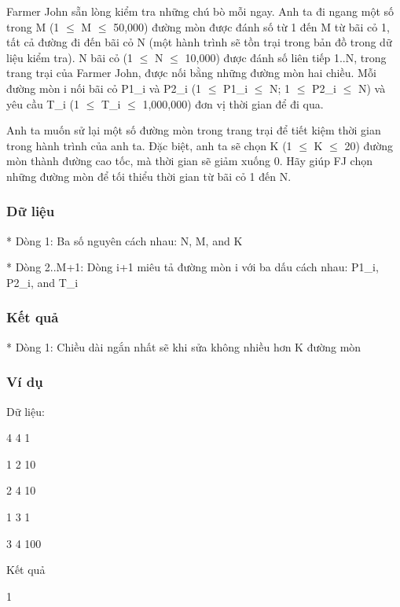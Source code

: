



   Farmer John sẵn lòng kiểm tra những chú bò mỗi ngay. Anh ta đi ngang một số  trong M (1  $\le$  M  $\le$  50,000) đường mòn được đánh số từ 1 đến M từ bãi cỏ 1, tất  cả đường đi đến bãi cỏ N (một hành trình sẽ tồn trại trong bản đồ trong dữ  liệu kiểm tra). N bãi cỏ (1  $\le$  N  $\le$  10,000) được đánh số liên tiếp 1..N, trong  trang trại của Farmer John, được nối bằng những đường mòn hai chiều. Mỗi đường  mòn i nối bãi cỏ P1\_i và P2\_i (1  $\le$  P1\_i  $\le$  N; 1  $\le$  P2\_i  $\le$  N) và yêu cầu T\_i  (1  $\le$  T\_i  $\le$  1,000,000) đơn vị thời gian để đi qua.  

   Anh ta muốn sử lại một số đường mòn trong trang trại để tiết kiệm thời gian trong  hành trình của anh ta. Đặc biệt, anh ta sẽ chọn K (1  $\le$  K  $\le$  20) đường mòn thành  đường cao tốc, mà thời gian sẽ giảm xuống 0. Hãy giúp FJ chọn những đường mòn để  tối thiểu thời gian từ bãi cỏ 1 đến N.  

\subsubsection{   Dữ liệu  }

   * Dòng 1: Ba số nguyên cách nhau: N, M, and K  

   * Dòng 2..M+1: Dòng i+1 miêu tả đường mòn i với ba dấu cách nhau: P1\_i, P2\_i, and T\_i  

\subsubsection{   Kết quả  }

   * Dòng 1: Chiều dài ngắn nhất sẽ khi sửa không nhiều hơn K đường mòn  

\subsubsection{   Ví dụ  }

   Dữ liệu:  

   4 4 1   


   1 2 10   


   2 4 10   


   1 3 1   


   3 4 100   




   Kết quả  

   1  
